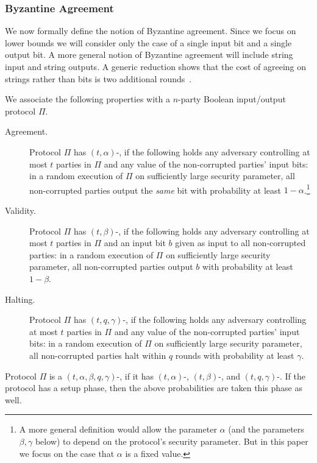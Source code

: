 \subsubsection{Byzantine Agreement}\label{sec:BA}

We now formally define the notion of Byzantine agreement. Since we focus on lower bounds we will consider only the case of a single input bit and a single output bit. A more general notion of Byzantine agreement will include string input and string outputs. A generic reduction shows that the cost of agreeing on strings rather than bits is two additional rounds~\cite{TC84}.

\begin{definition}\label{def:BA}
We associate the following properties with a \ppt $n$-party Boolean input/output protocol $\Pi$.

\begin{description}
	\item[Agreement.] Protocol $\Pi$ has {\sf $(t,\alpha)$-\Agr}, if the following holds \wrt any \ppt adversary controlling at most $t$ parties in $\Pi$ and any value of the non-corrupted parties' input bits: in a random execution of $\Pi$ on sufficiently large security parameter, all non-corrupted parties output the \emph{same} bit with probability at least $1-\alpha$.\footnote{A more general definition would allow the parameter $\alpha$ (and the parameters $\beta,\gamma$ below) to depend on the protocol's security parameter. But in this paper we focus on the case that $\alpha$ is a fixed value.}
	
	\item[Validity.] Protocol $\Pi$ has {\sf $(t,\beta)$-\Vld}, if the following holds \wrt any \ppt adversary controlling at most $t$ parties in $\Pi$ and an input bit $b$ given as input to all non-corrupted parties: in a random execution of $\Pi$ on sufficiently large security parameter, all non-corrupted parties output $b$ with probability at least $1-\beta$.
	
	\item[Halting.] Protocol $\Pi$ has {\sf $(t,q,\gamma)$-\Halt}, if the following holds \wrt any \ppt adversary controlling at most $t$ parties in $\Pi$ and any value of the non-corrupted parties' input bits: in a random execution of $\Pi$ on sufficiently large security parameter, all non-corrupted parties halt within $q$ rounds with probability at least $\gamma$.
\end{description}
	
\noindent
Protocol $\Pi$ is a $(t,\alpha,\beta,q,\gamma)$-\BA, if it has $(t,\alpha)$-\Agr, $(t,\beta)$-\Vld, and $(t,q,\gamma)$-\Halt. If the protocol has a setup phase, then the above probabilities are taken \wrt this phase as well.
\end{definition}

